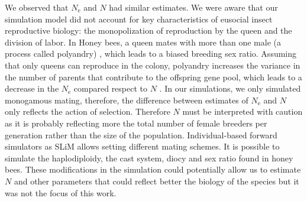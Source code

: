 \documentclass[a4paper, 12pt]{article}
\begin{document}
We observed that $N_\mathrm{e}$ and $N$ had similar estimates. We were aware that our simulation model did not account for key characteristics of eusocial insect reproductive biology: the monopolization of reproduction by the queen and the division of labor.
In Honey bees, a queen mates with more than one male (a process called polyandry) \citep{Estoup:jj}, which leads to a biased breeding sex ratio. Assuming that only queens can reproduce in the colony, polyandry increases the variance in the number of parents that contribute to the offspring gene pool, which leads to a decrease in the $N_\mathrm{e}$ compared respect to $N$ \citep{Nomura:2012bp}. In our simulations, we only simulated monogamous mating, therefore, the difference between estimates of $N_\mathrm{e}$ and $N$ only reflects the action of selection. Therefore $N$ must be interpreted with caution as it is probably reflecting more the total number of female breeders per generation rather than the size of the population. 
Individual-based forward simulators as SLiM allows setting different mating schemes. It is possible to simulate the haplodiploidy, the cast system, diocy and sex ratio found in honey bees. These modifications in the simulation could potentially allow us to estimate $N$ and other parameters that could reflect better the biology of the species but it was not the focus of this work.
\end{document}
